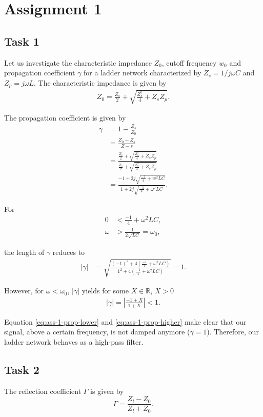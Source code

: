 \documentclass[11pt,titlepage]{report}
\begin{document}
\chapter{Assignment 1}
\section{Task 1}
Let us investigate the characteristic impedance $Z_0$, cutoff frequency $w_0$ and propagation coefficient $\gamma$ for a ladder network characterized by $Z_s=1/j \omega C$ and $Z_p=j \omega L$. The characteristic impedance is given by
\begin{align}
	Z_0 = \frac{Z_s}{2} + \sqrt{\frac{Z_s^2}{4} + Z_s Z_p}.
\end{align}

The propagation coefficient is given by
\begin{align}
	\gamma &= 1 - \frac{Z_s}{Z_0} \nonumber \\
	&= \frac{Z_0-Z_s}{Z-s} \nonumber \\
	&= \frac{\frac{Z_s}{2} + \sqrt{\frac{Z_s^2}{4} + Z_s Z_p}}{\frac{Z_s}{2} + \sqrt{\frac{Z_s^2}{4} + Z_s Z_p}} \nonumber \\
	&= \frac{-1 + 2j\sqrt{\frac{-1}{4} + w^2 L C}}{1 + 2j\sqrt{\frac{-1}{4} + \omega{}^2 L C}}.
\end{align}

For
\begin{align}
	0 &< \frac{-1}{4} + \omega^2 L C,  \nonumber \\
	\omega &> \frac{1}{2\sqrt{LC}} = \omega_0,
\end{align}

the length of $\gamma$ reduces to
\begin{align} \label{eq:ass-1-prop-higher}
	|\gamma| &= \sqrt{\frac{(-1)^2 + 4(\frac{-1}{4}+\omega^2 L C)}{1^2 + 4(\frac{-1}{4}+\omega^2 L C)}} = 1.
\end{align}

However, for $\omega<\omega_0$, $|\gamma|$ yields for some $X \in \mathbb{R}$, $X > 0$ 
\begin{align} \label{eq:ass-1-prop-lower}
	|\gamma| = \left|\frac{-1 + X}{1 + X}\right| < 1.
\end{align}

Equation \ref{eq:ass-1-prop-lower} and \ref{eq:ass-1-prop-higher} make clear that our signal, above a certain frequency, is not damped anymore ($\gamma=1$). Therefore, our ladder network behaves as a high-pass filter.

\section{Task 2}
The reflection coefficient $\Gamma$ is given by
\begin{equation}
	\Gamma = \frac{Z_l - Z_0}{Z_l + Z_0}.
\end{equation}
\end{document}
